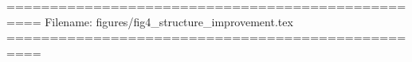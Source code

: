 
==================================================
Filename: figures/fig4_structure_improvement.tex
==================================================
